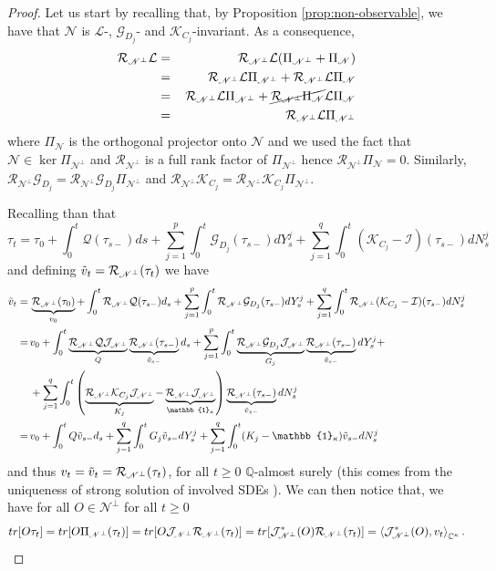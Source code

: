 \documentclass[aihp,12pt]{imsart}
\newcommand{\Gc}{\mathcal{G}}
\newcommand{\Jc}{\mathcal{J}}
\newcommand{\Rc}{\mathcal{R}}
\newcommand{\Qc}{\mathcal{Q}}
\newcommand{\Ic}{\mathcal{I}}
\newcommand{\Kc}{\mathcal{K}}
\newcommand{\Lc}{\mathcal{L}}
\newcommand{\Ns}{\mathscr{N}}
\newcommand{\Cb}{\mathbb{C}}
\newcommand{\one}{\mathbb{1}}
\newcommand{\tr}{{\rm tr}}
\newcommand{\inner}[2]{\left< #1,#2 \right>}
\theoremstyle{theorem}
\theoremstyle{definition}
\theoremstyle{remark}
\begin{document}
\begin{proof}
    Let us start by recalling that, by Proposition \ref{prop:non-observable}, we have that $\Ns$ is $\Lc$-,  $\Gc_{D_j}$- and $\Kc_{C_j}$-invariant. As a consequence, \begin{eqnarray*}\Rc_{\Ns^\perp}  \Lc &=\,& \Rc_{\Ns^\perp}  \Lc  (\Pi_{\Ns^\perp} + \Pi_\Ns)\\ &=\,& \Rc_{\Ns^\perp}  \Lc  \Pi_{\Ns^\perp} + \Rc_{\Ns^\perp}  \Lc  \Pi_{\Ns}\\ &=\,& \Rc_{\Ns^\perp}  \Lc  \Pi_{\Ns^\perp} + \cancel{\Rc_{\Ns^\perp}  \Pi_{\Ns}}  \Lc  \Pi_{\Ns}\\& =\,& \Rc_{\Ns^\perp}  \Lc  \Pi_{\Ns^\perp}
    \end{eqnarray*}where $\Pi_\Ns$ is the orthogonal projector onto $\Ns$ and we used the fact that $\Ns\in\ker\Pi_{\Ns^\perp}$ and $\Rc_{\Ns^\perp}$ is a full rank factor of $\Pi_{\Ns^\perp}$ hence $\Rc_{\Ns^\perp}\Pi_\Ns = 0$. Similarly, $\Rc_{\Ns^\perp}\Gc_{D_j} = \Rc_{\Ns^\perp}\Gc_{D_j}\Pi_{\Ns^\perp}$ and $\Rc_{\Ns^\perp}\Kc_{C_j} = \Rc_{\Ns^\perp}\Kc_{C_j}\Pi_{\Ns^\perp}$.
    
    Recalling than that 
    \[\tau_t = \tau_0 + \int_{0}^t \Qc(\tau_{s-}) ds + \sum_{j=1}^p \int_{0}^t \Gc_{D_j}(\tau_{s-}) dY_s^j + \sum_{j=1}^q \int_{0}^t (\Kc_{C_j}-\Ic)(\tau_{s-}) dN_s^j \]
    and defining $\Tilde{v}_t = \Rc_{\Ns^\perp}(\tau_t)$ we have 
    \begin{align*}
        \Tilde{v}_t =\,& \underbrace{\Rc_{\Ns^\perp}(\tau_0)}_{{v}_0}  + \int_0^t \Rc_{\Ns^\perp}  \Qc (\tau_{s-}) d_s + \sum_{j=1}^p \int_{0}^t \Rc_{\Ns^\perp}\Gc_{D_j}(\tau_{s-}) dY_s^j + \sum_{j=1}^q \int_{0}^t \Rc_{\Ns^\perp}(\Kc_{C_j}-\Ic)(\tau_{s-}) dN_s^j\\
        =\,& {v}_0 + \int_0^t \underbrace{\Rc_{\Ns^\perp}  \Qc  \Jc_{\Ns^\perp}}_{Q}  \underbrace{\Rc_{\Ns^\perp} (\tau_{s-})}_{\Tilde{v}_{s-}} d_s + \sum_{j=1}^p \int_{0}^t \underbrace{\Rc_{\Ns^\perp}\Gc_{D_j}  \Jc_{\Ns^\perp}}_{G_j}  \underbrace{\Rc_{\Ns^\perp} (\tau_{s-})}_{\Tilde{v}_{s-}} dY_s^j + \\
        &+ \sum_{j=1}^q \int_{0}^t \left(\underbrace{\Rc_{\Ns^\perp}\Kc_{C_j}\Jc_{\Ns^\perp}}_{K_j}-\underbrace{\Rc_{\Ns^\perp}\Jc_{\Ns^\perp}}_{\one_\kappa}\right)\underbrace{\Rc_{\Ns^\perp}(\tau_{s-})}_{\Tilde{v}_{s-}} dN_s^j\\
        =\,& {v}_0 + \int_0^t {Q} {\Tilde{v}_{s-}} d_s + \sum_{j=1}^q \int_{0}^t {G_j} {\Tilde{v}_{s-}} dY_s^j + \sum_{j=1}^q \int_{0}^t ({K_j}-\one_\kappa){\Tilde{v}_{s-}} dN_s^j
    \end{align*}
    and thus \(v_t=\Tilde{v}_t=\Rc_{\Ns^\perp}(\tau_t)\), for all $t\geq0$ $\mathbb{Q}$-almost surely (this comes from the uniqueness of strong solution of involved SDEs \cite[Section V.3]{protter2005stochastic}). 
    We can then notice that, we have for all $O\in\Ns^\perp$  for all $t\geq 0$ 
    \[\tr[O \tau_t] = \tr[O \Pi_{\Ns^\perp}(\tau_t)] = \tr[O \Jc_{\Ns^\perp}\Rc_{\Ns^\perp}(\tau_t)] = \tr[\Jc_{\Ns^\perp}^*(O) \Rc_{\Ns^\perp}(\tau_t)] = \inner{\Jc_{\Ns^\perp}^*(O)}{v_t}_{\Cb^\kappa}.\]


\end{proof}
\end{document}

